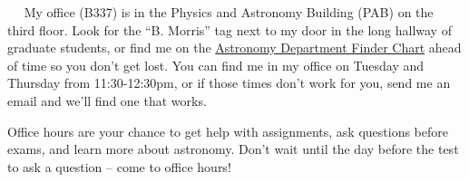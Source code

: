 \documentclass[12pt]{article}
\newcommand{\mytitle}[1]{\vspace{5mm} \noindent{\bf #1:} ~~}
\begin{document}
\mytitle{Office Hours} My office (B337) is in the Physics and Astronomy Building (PAB) on the third floor. Look for the ``B. Morris'' tag next to my door in the long hallway of graduate students, or find me on the \href{http://staff.washington.edu/bmmorris/docs/astromap.pdf}{Astronomy Department Finder Chart} ahead of time so you don't get lost. You can find me in my office on Tuesday and Thursday from 11:30-12:30pm, or if those times don't work for you, send me an email and we'll find one that works. 

Office hours are your chance to get help with assignments, ask questions before exams, and learn more about astronomy. Don't wait until the day before the test to ask a question -- come to office hours!
\end{document}
